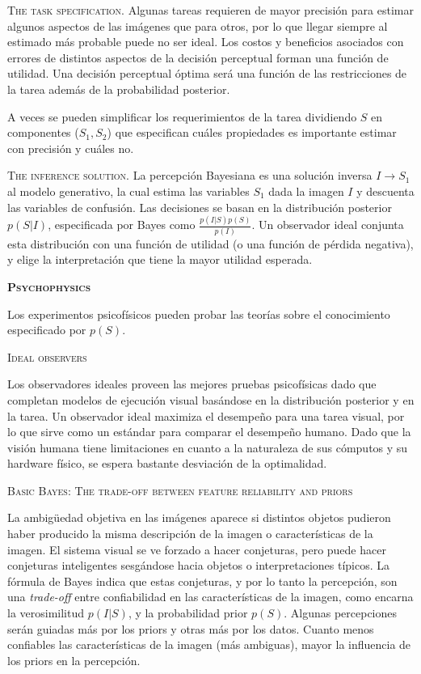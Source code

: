 \documentclass[a4paper,12pt]{article}
\begin{document}
{\scshape The task specification.} Algunas tareas requieren de mayor precisión para estimar algunos aspectos de las imágenes que para otros, por lo que llegar siempre al estimado más probable puede no ser ideal. Los costos y beneficios asociados con errores de distintos aspectos de la decisión perceptual forman una función de utilidad. Una decisión perceptual óptima será una función de las restricciones de la tarea además de la probabilidad posterior.

A veces se pueden simplificar los requerimientos de la tarea dividiendo $S$ en componentes ($S_{1}, S_{2}$) que especifican cuáles propiedades es importante estimar con precisión y cuáles no.

{\scshape The inference solution.} La percepción Bayesiana es una solución inversa $I \rightarrow S_{1}$ al modelo generativo, la cual estima las variables $S_{1}$ dada la imagen $I$ y descuenta las variables de confusión. Las decisiones se basan en la distribución posterior $p(S|I)$, especificada por Bayes como
$\frac{
	p(I|S)p(S)
}{
p(I)
}$. Un observador ideal conjunta esta distribución con una función de utilidad (o una función de pérdida negativa), y elige la interpretación que tiene la mayor utilidad esperada.

{\scshape\bfseries Psychophysics}

Los experimentos psicofísicos pueden probar las teorías sobre el conocimiento especificado por $p(S)$.

{\scshape Ideal observers}

Los observadores ideales proveen las mejores pruebas psicofísicas dado que completan modelos de ejecución visual basándose en la distribución posterior y en la tarea. Un observador ideal maximiza el desempeño para una tarea visual, por lo que sirve como un estándar para comparar el desempeño humano. Dado que la visión humana tiene limitaciones en cuanto a la naturaleza de sus cómputos y su hardware físico, se espera bastante desviación de la optimalidad. 

{\scshape Basic Bayes: The trade-off between feature reliability and priors}

La ambigüedad objetiva en las imágenes aparece si distintos objetos pudieron haber producido la misma descripción de la imagen o características de la imagen. El sistema visual se ve forzado a hacer conjeturas, pero puede hacer conjeturas inteligentes sesgándose hacia objetos o interpretaciones típicos. La fórmula de Bayes indica que estas conjeturas, y por lo tanto la percepción, son una {\itshape trade-off} entre confiabilidad en las características de la imagen, como encarna la verosimilitud $p(I|S)$, y la probabilidad prior $p(S)$. Algunas percepciones serán guiadas más por los priors y otras más por los datos. Cuanto menos confiables las características de la imagen (más ambiguas), mayor la influencia de los priors en la percepción. 
\end{document}
